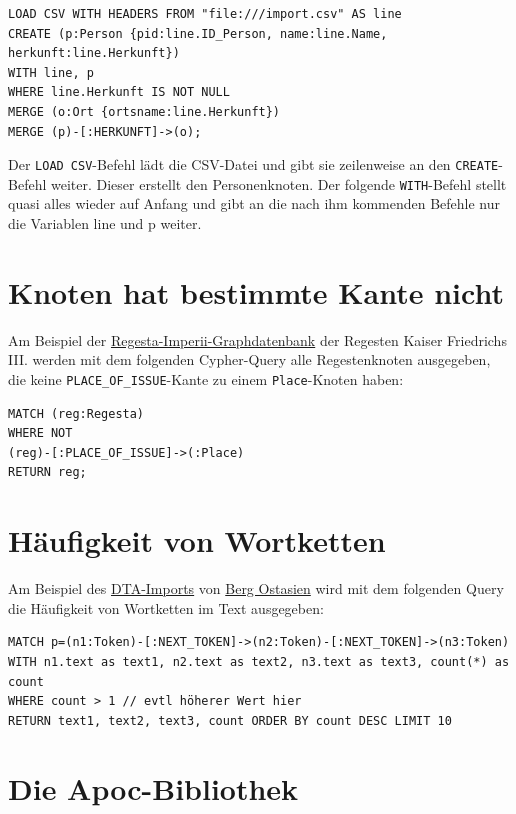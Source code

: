 \documentclass[ngerman,]{scrreprt}
\begin{document}
\begin{verbatim}
LOAD CSV WITH HEADERS FROM "file:///import.csv" AS line
CREATE (p:Person {pid:line.ID_Person, name:line.Name, herkunft:line.Herkunft})
WITH line, p
WHERE line.Herkunft IS NOT NULL
MERGE (o:Ort {ortsname:line.Herkunft})
MERGE (p)-[:HERKUNFT]->(o);
\end{verbatim}

Der \texttt{LOAD\ CSV}-Befehl lädt die CSV-Datei und gibt sie zeilenweise an den \texttt{CREATE}-Befehl weiter. Dieser erstellt den Personenknoten. Der folgende \texttt{WITH}-Befehl stellt quasi alles wieder auf Anfang und gibt an die nach ihm kommenden Befehle nur die Variablen line und p weiter.

\section{Knoten hat bestimmte Kante nicht}\label{knoten-hat-bestimmte-kante-nicht}

Am Beispiel der \href{http://134.176.70.65:10210/browser/}{Regesta-Imperii-Graphdatenbank} der Regesten Kaiser Friedrichs III. werden mit dem folgenden Cypher-Query alle Regestenknoten ausgegeben, die keine \texttt{PLACE\_OF\_ISSUE}-Kante zu einem \texttt{Place}-Knoten haben:

\begin{verbatim}
MATCH (reg:Regesta)
WHERE NOT
(reg)-[:PLACE_OF_ISSUE]->(:Place)
RETURN reg;
\end{verbatim}

\section{Häufigkeit von Wortketten}\label{huxe4ufigkeit-von-wortketten}

Am Beispiel des \href{http://134.176.70.65:10220/browser/}{DTA-Imports} von \href{http://www.deutschestextarchiv.de/book/show/berg_ostasien01_1864}{Berg Ostasien} wird mit dem folgenden Query die Häufigkeit von Wortketten im Text ausgegeben:

\begin{verbatim}
MATCH p=(n1:Token)-[:NEXT_TOKEN]->(n2:Token)-[:NEXT_TOKEN]->(n3:Token)
WITH n1.text as text1, n2.text as text2, n3.text as text3, count(*) as count
WHERE count > 1 // evtl höherer Wert hier
RETURN text1, text2, text3, count ORDER BY count DESC LIMIT 10
\end{verbatim}

\section{Die Apoc-Bibliothek}\label{die-apoc-bibliothek}
\end{document}
